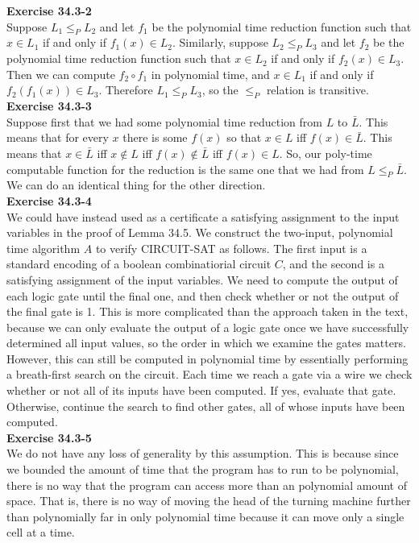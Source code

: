 \documentclass{article}
\begin{document}
\noindent\textbf{Exercise 34.3-2}\\

Suppose $L_1 \leq_P L_2$ and let $f_1$ be the polynomial time reduction function such that $x \in L_1$ if and only if $f_1(x) \in L_2$.  Similarly, suppose $L_2 \leq_P L_3$ and let $f_2$ be the polynomial time reduction function such that $x \in L_2$ if and only if $f_2(x) \in L_3$.  Then we can compute $f_2 \circ f_1$ in polynomial time, and $x \in L_1$ if and only if $f_2(f_1(x)) \in L_3$.  Therefore $L_1 \leq_P L_3$, so the $\leq_P$ relation is transitive. \\

\noindent\textbf{Exercise 34.3-3}\\

Suppose first that we had some polynomial time reduction from $L$ to $\bar{L}$. This means that for every $x$ there is some $f(x)$ so that $x\in L$ iff $f(x)\in \bar{L}$. This means that $x\in \bar{L}$ iff $x\not\in L$ iff $f(x)\not\in\bar{L}$ iff $f(x)\in L$. So, our poly-time computable function for the reduction is the same one that we had from $L\le_P \bar{L}$. We can do an identical thing for the other direction.\\

\noindent\textbf{Exercise 34.3-4}\\

We could have instead used as a certificate a satisfying assignment to the input variables in the proof of Lemma 34.5.  We construct the two-input, polynomial time algorithm $A$ to verify CIRCUIT-SAT as follows.  The first input is a standard encoding of a boolean combinatiorial circuit $C$, and the second is a satisfying assignment of the input variables.  We need to compute the output of each logic gate until the final one, and then check whether or not the output of the final gate is 1.  This is more complicated than the approach taken in the text, because we can only evaluate the output of a logic gate once we have successfully determined all input values, so the order in which we examine the gates matters.  However, this can still be computed in polynomial time by essentially performing a breath-first search on the circuit. Each time we reach a gate via a wire we check whether or not all of its inputs have been computed.  If yes, evaluate that gate.  Otherwise, continue the search to find other gates, all of whose inputs have been computed. \\


\noindent\textbf{Exercise 34.3-5}\\
We do not have any loss of generality by this assumption. This is because since we bounded the amount of time that the program has to run to be polynomial, there is no way that the program can access more than an polynomial amount of space. That is, there is no way of moving the head of the turning machine further than polynomially far in only polynomial time because it can move only a single cell at a time.\\
\end{document}
